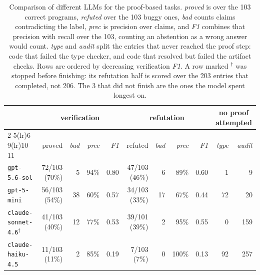 \begin{table}[t]\centering\footnotesize
\caption{Comparison of different LLMs for the proof-based tasks. \emph{proved} is over the 103 correct programs, \emph{refuted} over the 103 buggy ones, \emph{bad} counts claims contradicting the label, \emph{prec} is precision over claims, and \emph{F1} combines that precision with recall over the 103, counting an abstention as a wrong answer would count. \emph{type} and \emph{audit} split the entries that never reached the proof step: code that failed the type checker, and code that resolved but failed the artifact checks. Rows are ordered by decreasing verification \emph{F1}. A row marked $^{\dagger}$ was stopped before finishing: its refutation half is scored over the 203 entries that completed, not 206. The 3 that did not finish are the ones the model spent longest on.}
\label{tab:weakmodel}
\begin{tabular}{lrrrrrrrrrr}
\toprule
& \multicolumn{4}{c}{verification} & \multicolumn{4}{c}{refutation} & \multicolumn{2}{c}{no proof attempted} \\
\cmidrule(lr){2-5}\cmidrule(lr){6-9}\cmidrule(lr){10-11}
& proved & \emph{bad} & \emph{prec} & \emph{F1} & refuted & \emph{bad} & \emph{prec} & \emph{F1} & \emph{type} & \emph{audit} \\
\midrule
\texttt{gpt-5.6-sol} & 72/103 (70\%) & 5 & 94\% & 0.80 & 47/103 (46\%) & 6 & 89\% & 0.60 & 1 & 9 \\
\texttt{gpt-5-mini} & 56/103 (54\%) & 38 & 60\% & 0.57 & 34/103 (33\%) & 17 & 67\% & 0.44 & 72 & 20 \\
\texttt{claude-sonnet-4.6}$^{\dagger}$ & 41/103 (40\%) & 12 & 77\% & 0.53 & 39/101 (39\%) & 2 & 95\% & 0.55 & 0 & 159 \\
\texttt{claude-haiku-4.5} & 11/103 (11\%) & 2 & 85\% & 0.19 & 7/103 (7\%) & 0 & 100\% & 0.13 & 92 & 257 \\
\bottomrule
\end{tabular}

\end{table}
